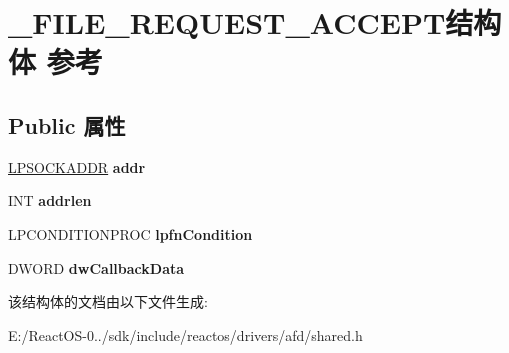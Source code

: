 \hypertarget{struct___f_i_l_e___r_e_q_u_e_s_t___a_c_c_e_p_t}{}\section{\+\_\+\+F\+I\+L\+E\+\_\+\+R\+E\+Q\+U\+E\+S\+T\+\_\+\+A\+C\+C\+E\+P\+T结构体 参考}
\label{struct___f_i_l_e___r_e_q_u_e_s_t___a_c_c_e_p_t}
\subsection*{Public 属性}
\begin{DoxyCompactItemize}
\item 
\mbox{\label{struct___f_i_l_e___r_e_q_u_e_s_t___a_c_c_e_p_t_acee64ae520516ac5549b42b74b524f8a}} 
\hyperlink{structsockaddr}{L\+P\+S\+O\+C\+K\+A\+D\+DR} {\bfseries addr}
\item 
\mbox{\label{struct___f_i_l_e___r_e_q_u_e_s_t___a_c_c_e_p_t_ada238b0fc9514e0ac53da7922041a206}} 
I\+NT {\bfseries addrlen}
\item 
\mbox{\label{struct___f_i_l_e___r_e_q_u_e_s_t___a_c_c_e_p_t_a9ae2e56bcc8bf508cc025256debed59a}} 
L\+P\+C\+O\+N\+D\+I\+T\+I\+O\+N\+P\+R\+OC {\bfseries lpfn\+Condition}
\item 
\mbox{\label{struct___f_i_l_e___r_e_q_u_e_s_t___a_c_c_e_p_t_a58c6d680afd84e0d38bb9fe888e769a4}} 
D\+W\+O\+RD {\bfseries dw\+Callback\+Data}
\end{DoxyCompactItemize}


该结构体的文档由以下文件生成\+:\begin{DoxyCompactItemize}
\item 
E\+:/\+React\+O\+S-\/0../sdk/include/reactos/drivers/afd/shared.\+h\end{DoxyCompactItemize}
